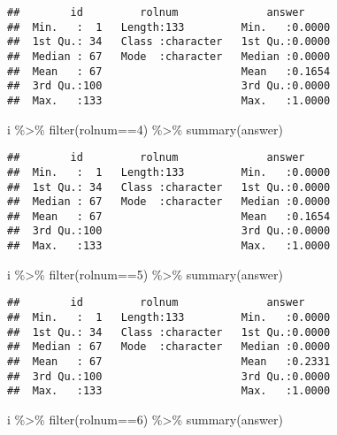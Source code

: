 \documentclass[
]{article}
\newenvironment{Shaded}{\begin{snugshade}}{\end{snugshade}}
\newcommand{\DecValTok}[1]{\textcolor[rgb]{0.00,0.00,0.81}{#1}}
\newcommand{\FunctionTok}[1]{\textcolor[rgb]{0.00,0.00,0.00}{#1}}
\newcommand{\NormalTok}[1]{#1}
\newcommand{\SpecialCharTok}[1]{\textcolor[rgb]{0.00,0.00,0.00}{#1}}
\begin{document}
\begin{enumerate}
\begin{verbatim}
##        id         rolnum              answer      
##  Min.   :  1   Length:133         Min.   :0.0000  
##  1st Qu.: 34   Class :character   1st Qu.:0.0000  
##  Median : 67   Mode  :character   Median :0.0000  
##  Mean   : 67                      Mean   :0.1654  
##  3rd Qu.:100                      3rd Qu.:0.0000  
##  Max.   :133                      Max.   :1.0000
\end{verbatim}

\begin{Shaded}
\begin{Highlighting}[]
\NormalTok{i }\SpecialCharTok{\%\textgreater{}\%} \FunctionTok{filter}\NormalTok{(rolnum}\SpecialCharTok{==}\DecValTok{4}\NormalTok{) }\SpecialCharTok{\%\textgreater{}\%} \FunctionTok{summary}\NormalTok{(answer)}
\end{Highlighting}
\end{Shaded}

\begin{verbatim}
##        id         rolnum              answer      
##  Min.   :  1   Length:133         Min.   :0.0000  
##  1st Qu.: 34   Class :character   1st Qu.:0.0000  
##  Median : 67   Mode  :character   Median :0.0000  
##  Mean   : 67                      Mean   :0.1654  
##  3rd Qu.:100                      3rd Qu.:0.0000  
##  Max.   :133                      Max.   :1.0000
\end{verbatim}

\begin{Shaded}
\begin{Highlighting}[]
\NormalTok{i }\SpecialCharTok{\%\textgreater{}\%} \FunctionTok{filter}\NormalTok{(rolnum}\SpecialCharTok{==}\DecValTok{5}\NormalTok{) }\SpecialCharTok{\%\textgreater{}\%} \FunctionTok{summary}\NormalTok{(answer)}
\end{Highlighting}
\end{Shaded}

\begin{verbatim}
##        id         rolnum              answer      
##  Min.   :  1   Length:133         Min.   :0.0000  
##  1st Qu.: 34   Class :character   1st Qu.:0.0000  
##  Median : 67   Mode  :character   Median :0.0000  
##  Mean   : 67                      Mean   :0.2331  
##  3rd Qu.:100                      3rd Qu.:0.0000  
##  Max.   :133                      Max.   :1.0000
\end{verbatim}

\begin{Shaded}
\begin{Highlighting}[]
\NormalTok{i }\SpecialCharTok{\%\textgreater{}\%} \FunctionTok{filter}\NormalTok{(rolnum}\SpecialCharTok{==}\DecValTok{6}\NormalTok{) }\SpecialCharTok{\%\textgreater{}\%} \FunctionTok{summary}\NormalTok{(answer)}
\end{Highlighting}
\end{Shaded}


\end{enumerate}
\end{document}
